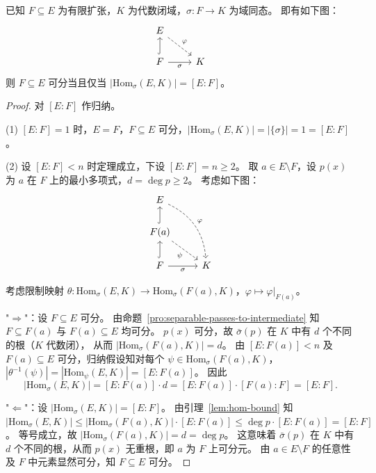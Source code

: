 \documentclass[lang=cn,a4paper,newtx]{elegantbook}
\begin{document}
\begin{theorem}\label{separable-iff-hom-count}
  已知 $F\subseteq E$ 为有限扩张，$K$ 为代数闭域，$\sigma\colon F\to K$ 为域同态。
  即有如下图：
  \[
    \begin{tikzcd}
      E \arrow[dr,dashed,"\varphi"] \\
      F \arrow[u,hook] \arrow[r,"\sigma"'] & K
    \end{tikzcd}
  \]
  则 $F\subseteq E$ 可分当且仅当 $|\mathrm{Hom}_{\sigma}(E,K)|=[E:F]$。
\end{theorem}

\begin{proof}
  对 $[E:F]$ 作归纳。

  (1) $[E:F]=1$ 时，$E=F$，$F\subseteq E$ 可分，$|\mathrm{Hom}_{\sigma}(E,K)|=|\{\sigma\}|=1=[E:F]$。

  (2) 设 $[E:F]<n$ 时定理成立，下设 $[E:F]=n\ge 2$。
  取 $a\in E\setminus F$，设 $p(x)$ 为 $a$ 在 $F$ 上的最小多项式，$d=\deg p\ge 2$。
  考虑如下图：
  \[
    \begin{tikzcd}
      E \arrow[ddr,bend left,dashed,"\varphi"] \\
      F(a) \arrow[u,hook] \arrow[dr,dashed,"\psi"'] \\
      F \arrow[u,hook] \arrow[r,"\sigma"'] & K
    \end{tikzcd}
  \]

  考虑限制映射 $\theta\colon\mathrm{Hom}_{\sigma}(E,K)\to\mathrm{Hom}_{\sigma}(F(a),K)$，$\varphi\mapsto\varphi\big|_{F(a)}$。

  "$\Rightarrow$"：设 $F\subseteq E$ 可分。
  由命题~\ref{pro:separable-passes-to-intermediate} 知 $F\subseteq F(a)$ 与 $F(a)\subseteq E$ 均可分。
  $p(x)$ 可分，故 $\bar\sigma(p)$ 在 $K$ 中有 $d$ 个不同的根（$K$ 代数闭），
  从而 $|\mathrm{Hom}_{\sigma}(F(a),K)|=d$。
  由 $[E:F(a)]<n$ 及 $F(a)\subseteq E$ 可分，归纳假设知对每个 $\psi\in\mathrm{Hom}_{\sigma}(F(a),K)$，
  $|\theta^{-1}(\psi)|=|\mathrm{Hom}_{\psi}(E,K)|=[E:F(a)]$。
  因此
  \[
    |\mathrm{Hom}_{\sigma}(E,K)|=[E:F(a)]\cdot d=[E:F(a)]\cdot[F(a):F]=[E:F].
  \]

  "$\Leftarrow$"：设 $|\mathrm{Hom}_{\sigma}(E,K)|=[E:F]$。
  由引理~\ref{lem:hom-bound} 知 $|\mathrm{Hom}_{\sigma}(E,K)|\le|\mathrm{Hom}_{\sigma}(F(a),K)|\cdot[E:F(a)]\le\deg p\cdot[E:F(a)]=[E:F]$。
  等号成立，故 $|\mathrm{Hom}_{\sigma}(F(a),K)|=d=\deg p$。
  这意味着 $\bar\sigma(p)$ 在 $K$ 中有 $d$ 个不同的根，从而 $p(x)$ 无重根，即 $a$ 为 $F$ 上可分元。
  由 $a\in E\setminus F$ 的任意性及 $F$ 中元素显然可分，知 $F\subseteq E$ 可分。
\end{proof}
\end{document}
